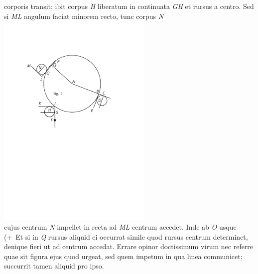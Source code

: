 corporis
transit; ibit corpus \textit{H} liberatum in continuata \textit{GH} et rursus  a centro. Sed si \textit{ML} angulum faciat minorem recto, tunc corpus \textit{N} 
\pend
\count{}
\count{}
\newpage
\pstart
\centering
\includegraphics[width=0.56\textwidth]{images/LH0351402_103v-d1.pdf}\\
\pend
\vspace{1em}
\pstart\noindent cujus centrum \textit{N} impellet in recta ad \textit{ML} 
centrum accedet. Inde ab \textit{O} usque
(+~Et si in \textit{Q} rursus aliquid ei occurrat simile quod rursus centrum determinet,
denique fieri ut ad centrum accedat.
Errare opinor doctissimum virum nec referre quae sit figura ejus quod urgeat, sed quem impetum\protect{} in qua linea communicet; succurrit tamen aliquid pro ipso. 
